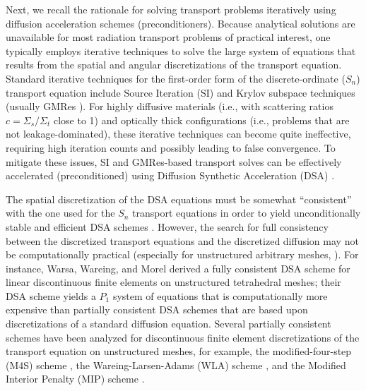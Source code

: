\documentclass[preprint,10pt]{elsarticle}
\renewcommand{\(}{\left(}
\renewcommand{\)}{\right)}
\renewcommand{\[}{\left[}
\renewcommand{\]}{\right]}
\newcommand{\sn}{\ensuremath{S_n}\xspace}
\begin{document}
Next, we recall the rationale for solving transport problems iteratively using 
diffusion acceleration schemes (preconditioners).
Because analytical solutions are unavailable for most
radiation transport problems of practical interest, one typically employs
iterative techniques to solve the large system of equations that results from
the spatial and angular discretizations of the transport equation. Standard
iterative techniques for the first-order form of the discrete-ordinate (\sn)
transport equation include Source Iteration (SI)  and Krylov 
subspace techniques (usually GMRes \cite{gmres}). For highly diffusive materials 
(i.e., with scattering ratios $c=\Sigma_s / \Sigma_t $ close to 1) and optically 
thick configurations (i.e., problems that are not leakage-dominated), these iterative techniques 
can become quite ineffective, requiring high iteration counts and possibly 
leading to false convergence. To mitigate these issues, SI and GMRes-based transport solves 
can be effectively accelerated (preconditioned) using Diffusion Synthetic Acceleration (DSA) 
\cite{dsa_ref,larsen_dsa,consistent_p1,m4s,wla,mip}. 

The spatial discretization of the DSA equations
must be somewhat ``consistent'' with the one used for the \sn transport equations 
in order to yield unconditionally stable and efficient DSA schemes
\cite{dsa_ref,larsen_dsa,consistent_p1,m4s,wla,mip}. However, the search for full
consistency between the discretized transport equations and the discretized
diffusion may not be computationally practical (especially for unstructured
arbitrary meshes, \cite{dsa_ref}). For instance, Warsa, Wareing, and
Morel \cite{consistent_p1} derived a fully consistent DSA scheme for linear
discontinuous finite elements on unstructured tetrahedral meshes; their DSA
scheme yields a $P_1$ system of equations that is
computationally more expensive than partially consistent DSA schemes that are
based upon discretizations of a standard diffusion equation. Several partially 
consistent schemes have been analyzed for discontinuous finite element
discretizations of the transport equation on unstructured meshes, for
example, the modified-four-step (M4S) scheme \cite{m4s}, the
Wareing-Larsen-Adams (WLA) scheme \cite{wla}, and the Modified Interior
Penalty (MIP) scheme \cite{mip}.

\end{document}
